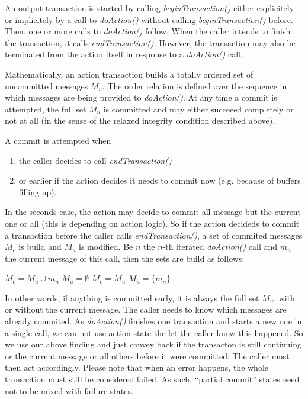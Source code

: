 \documentclass[a4paper,10pt]{article}
\begin{document}
An output transaction is started by calling \emph{beginTransaction()} either explicitely or implicitely by a call to \emph{doAction()} without calling \emph{beginTransaction()} before. Then, one or more calls to \emph{doAction()} follow. When the caller intends to finish the transaction, it calls \emph{endTransaction()}. However, the transaction may also be terminated from the action itself in response to a \emph{doAction()} call.

Mathematically, an action transaction builds a totally ordered set of uncommitted messages $M_u$. The order relation is defined over the sequence in which messages are being provided to \emph{doAction()}. At any time a commit is attempted, the full set $M_u$ is committed and may either succeeed completely or not at all (in the sense of the relaxed integrity condition described above). 

A commit is attempted when 
\begin{enumerate}
\item the caller decides to call \emph{endTransaction()} 
\item or earlier if the action decides it needs to commit now (e.g. because of buffers filling up).
\end{enumerate}

In the seconds case, the action may decide to commit all message but the current one or all (this is depending on action logic). So if the action decideds to commit a transaction before the caller calls \emph{endTransaction()}, a set of commited messages $M_c$ is build and $M_u$ is modified. Be $n$ the $n$-th iterated \emph{doAction()} call and $m_n$ the current message of this call, then the sets are build as follows:

\begin{algorithm}
\begin{algorithmic}
	\STATE $M_c = M_u \cup m_n$
	\STATE $M_u = \emptyset$
\ELSE
	\STATE $M_c = M_u$
	\STATE $M_u = \{ m_n\}$
\ENDIF
\end{algorithmic}
\end{algorithm}

In other words, if anything is committed early, it is always the full set $M_u$, with or without the current message. The caller needs to know which messages are already commited. As \emph{doAction()} finishes one transaction and starts a new one in a single call, we can not use action state the let the caller know this happened. So we use our above finding and just convey back if the transacton is still continuing or the current message or all others before it were committed. The caller must then act accordingly. Please note that when an error happens, the whole transaction must still be considered failed. As such, ``partial commit'' states need not to be mixed with failure states.
\end{document}
